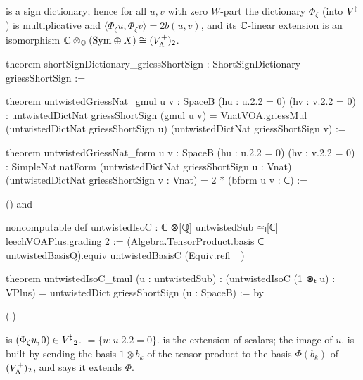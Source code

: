 \begin{theorem}\label{ch21:thm:griessShortSign}
 is a sign dictionary; hence for all $u,v$ with zero $W$-part the dictionary
$\Phi_\zeta$ (into ${V^{\natural}}$) is multiplicative and $\langle\Phi_\zeta u,\Phi_\zeta v\rangle=2b(u,v)$, and its
${\mathbb{C}}$-linear extension is an isomorphism ${\mathbb{C}}\otimes_{\mathbb{Q}}(\mathrm{Sym}\oplus X)\cong(V_{\Lambda}^+)_2$.
\end{theorem}
\begin{leancode}
theorem shortSignDictionary_griessShortSign : ShortSignDictionary griessShortSign :=
\end{leancode}
\begin{leancode}
theorem untwistedGriessNat_gmul {u v : SpaceB} (hu : u.2.2 = 0) (hv : v.2.2 = 0) :
    untwistedDictNat griessShortSign (gmul u v)
      = VnatVOA.griessMul (untwistedDictNat griessShortSign u)
          (untwistedDictNat griessShortSign v) :=
\end{leancode}
\begin{leancode}
theorem untwistedGriessNat_form {u v : SpaceB} (hu : u.2.2 = 0) (hv : v.2.2 = 0) :
    SimpleNat.natForm (untwistedDictNat griessShortSign u : Vnat)
        (untwistedDictNat griessShortSign v : Vnat) = 2 * (bform u v : ℂ) :=
\end{leancode}
() and
\begin{leancode}
noncomputable def untwistedIsoC : ℂ ⊗[ℚ] untwistedSub ≃ₗ[ℂ] leechVOAPlus.grading 2 :=
  (Algebra.TensorProduct.basis ℂ untwistedBasisQ).equiv untwistedBasisC (Equiv.refl _)
\end{leancode}
\begin{leancode}
theorem untwistedIsoC_tmul (u : untwistedSub) :
    (untwistedIsoC (1 ⊗ₜ u) : VPlus) = untwistedDict griessShortSign (u : SpaceB) := by
\end{leancode}
(.)
\begin{dictionary}
 is $(\Phi_\zeta u,0)\in{V^{\natural}}_2$.   $=\{u:u.2.2=0\}$.
 is the extension of scalars;  the image of $u$.  
is built by sending the basis $1\otimes b_k$ of the tensor product to the basis $\Phi(b_k)$ of
$(V_{\Lambda}^+)_2$, and  says it extends $\Phi$.
\end{dictionary}
